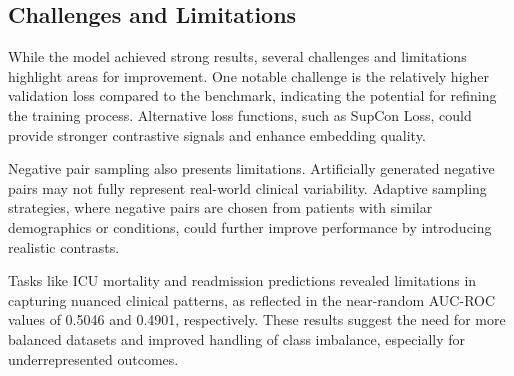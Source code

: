 \documentclass[twocolumn]{article}
\begin{document}
    \begin{table}[h]
        \centering
        \caption{Comparison of Results with Benchmark Study}
         \label{tab:benchmark_comparison2}
    \end{table}
    \subsection{Challenges and Limitations}

    While the model achieved strong results, several challenges and limitations highlight
    areas for improvement. One notable challenge is the relatively higher
    validation loss compared to the benchmark, indicating the potential for refining
    the training process. Alternative loss functions, such as SupCon Loss, could
    provide stronger contrastive signals and enhance embedding quality.

    Negative pair sampling also presents limitations. Artificially generated negative
    pairs may not fully represent real-world clinical variability. Adaptive
    sampling strategies, where negative pairs are chosen from patients with similar
    demographics or conditions, could further improve performance by introducing
    realistic contrasts.

    Tasks like ICU mortality and readmission predictions revealed limitations in
    capturing nuanced clinical patterns, as reflected in the near-random AUC-ROC
    values of 0.5046 and 0.4901, respectively. These results suggest the need for
    more balanced datasets and improved handling of class imbalance, especially
    for underrepresented outcomes.
\end{document}
